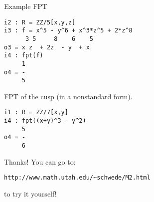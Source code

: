 \documentclass[xcolor=dvipsnames]{beamer}
\theoremstyle{remark}
\begin{document}
\begin{frame}[fragile]{Example FPT}
\begin{verbatim}
i2 : R = ZZ/5[x,y,z]
i3 : f = x^5 - y^6 + x^3*z^5 + 2*z^8
      3 5     8    6    5
o3 = x z  + 2z  - y  + x
i4 : fpt(f)
     1
o4 = -
     5
\end{verbatim}
FPT of the cusp (in a nonstandard form).
\begin{verbatim}
i1 : R = ZZ/7[x,y]
i4 : fpt((x+y)^3 - y^2)
     5
o4 = -
     6
\end{verbatim}
\end{frame}

\begin{frame}[c]{Thanks!}
You can go to:
\begin{center}
{\tt http://www.math.utah.edu/{\textasciitilde}schwede/M2.html}
\end{center}
to try it yourself!
\end{frame}
\end{document}
